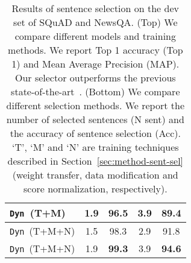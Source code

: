 \documentclass[11pt,a4paper]{article}
\newcommand{\dyn}{{\tt Dyn}}
\begin{document}
\begin{table}[ht]
\begin{center}
{\begin{tabular}{|l||c|c||c|c|}
 \dyn~\small{(T+M)}& 1.9 & 96.5 & 3.9 & 89.4 \\
 \hline
 \dyn~\small{(T+M+N)}& 1.5 & 98.3 & 2.9 & 91.8 \\
 \dyn~\small{(T+M+N)}& 1.9 & {\bf 99.3} & 3.9 & {\bf 94.6} \\
 \hline
\end{tabular}
}
\end{center}
\caption{ Results of sentence selection on the dev set of SQuAD and NewsQA.
(Top)
We compare different models and training methods.
We report Top 1 accuracy (Top 1) and Mean Average Precision (MAP).
Our selector outperforms the previous state-of-the-art~\cite{squad-selection-sota}.
(Bottom)
We compare different selection methods. We report the number of selected sentences (N sent) and the accuracy of sentence selection (Acc).
`T', `M' and `N' are training techniques described in Section~\ref{sec:method-sent-sel} (weight transfer, data modification and score normalization, respectively).
} 
\label{tab:class-result}
\vspace{-8pt}
\end{table}
\end{document}
